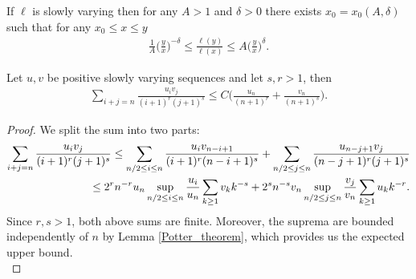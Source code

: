 \documentclass{ws-sd}
\begin{document}
\begin{lemma}\label{Potter_theorem}
    If $\ell$ is slowly varying then for any $A >1$ and $\delta >0$ there exists $x_0=x_0(A,\delta)$ such that for any $x_0 \le x \le y$
    \begin{align*}
        \frac{1}{A}\Big(\frac{y}{x}\Big)^{-\delta} \le \frac{\ell(y)}{\ell(x)} \le A\Big(\frac{y}{x}\Big)^{\delta}.
    \end{align*}
\end{lemma}

\begin{lemma}\label{double_somme}
        Let $u,v$ be positive slowly varying sequences and let $s,r > 1$, then
        \begin{align*}
            \sum_{i+j=n} \frac{u_iv_j}{(i+1)^r(j+1)^s} \le C \Big(\frac{u_n}{(n+1)^r}+ \frac{v_n}{(n+1)^s} \Big).
        \end{align*}
    \end{lemma}
    \begin{proof}
       We split the sum into two parts:
       \begin{align*}
            \sum_{i+j=n} \frac{u_iv_j}{(i+1)^r(j+1)^s}
            &\le \sum_{n/2 \le i \le n} \frac{u_iv_{n-i+1}}{(i+1)^r(n-i+1)^s} + \sum_{n/2 \le j \le n}\frac{u_{n-j+1} v_j}{(n-j+1)^r(j+1)^s} \\
            &\hspace{-20pt}\le 2^rn^{-r}u_n \sup_{n/2 \le i \le n} \frac{u_i}{u_n} \sum_{k \ge 1}v_k k^{-s} +  2^sn^{-s}v_n \sup_{n/2 \le j \le n} \frac{v_j}{v_n} \sum_{k \ge 1} u_kk^{-r}.
       \end{align*}
       Since $r,s > 1$, both above sums are finite. Moreover, the suprema are bounded independently of $n$ by Lemma \ref{Potter_theorem}, which provides us the expected upper bound. \\
    \end{proof}
\end{document}
